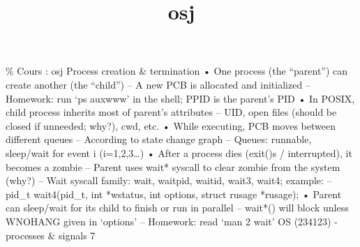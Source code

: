 \documentclass[12pt]{article}
\title{osj}
\author{}
\date{}
\begin{document}
\maketitle
\tableofcontents
\newpage

\% Cours : osj
Process creation \& termination
• One process (the “parent”) can create another (the “child”)
– A new PCB is allocated and initialized
– Homework: run ‘ps auxwww’ in the shell; PPID is the parent’s PID
• In POSIX, child process inherits most of parent’s attributes
– UID, open files (should be closed if unneeded; why?), cwd, etc.
• While executing, PCB moves between different queues
– According to state change graph 
– Queues: runnable, sleep/wait for event i (i=1,2,3…)
• After a process dies (exit()s / interrupted), it becomes a zombie
– Parent uses wait* syscall to clear zombie from the system (why?)
– Wait syscall family: wait, waitpid, waitid, wait3, wait4; example:
– pid\_t wait4(pid\_t, int *wstatus, int options, struct rusage *rusage); 
• Parent can sleep/wait for its child to finish or run in parallel
– wait*() will block unless WNOHANG given in ‘options’
– Homework: read ‘man 2 wait’
OS (234123) - processes \& signals
7
\end{document}
